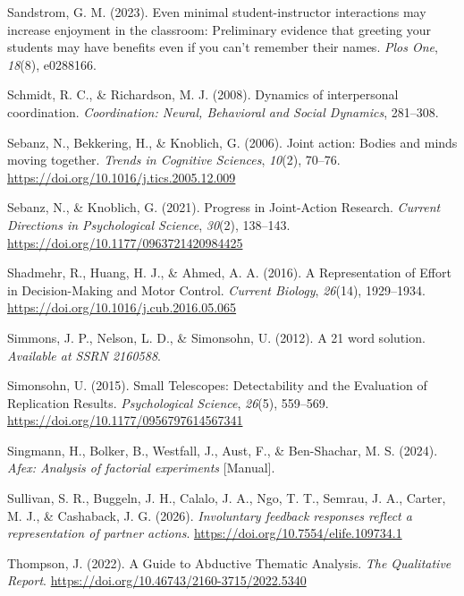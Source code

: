 \documentclass[
  11pt,
  letterpaper,
]{article}
\newlength{\cslhangindent}
\newenvironment{CSLReferences}[2] %
 {\begin{list}{}{%
  \setlength{\itemindent}{0pt}
  \setlength{\leftmargin}{0pt}
  \setlength{\parsep}{0pt}
  \ifodd #1
   \setlength{\leftmargin}{\cslhangindent}
   \setlength{\itemindent}{-1\cslhangindent}
  \fi
  \setlength{\itemsep}{#2\baselineskip}}}
 {\end{list}}
\renewcommand{\emph}[1]{\textit{#1}}  %
\begin{document}
\begin{CSLReferences}{1}{0}
Sandstrom, G. M. (2023). Even minimal student-instructor interactions
may increase enjoyment in the classroom: {Preliminary} evidence that
greeting your students may have benefits even if you can't remember
their names. \emph{Plos One}, \emph{18}(8), e0288166.

Schmidt, R. C., \& Richardson, M. J. (2008). Dynamics of interpersonal
coordination. \emph{Coordination: Neural, Behavioral and Social
Dynamics}, 281--308.

Sebanz, N., Bekkering, H., \& Knoblich, G. (2006). Joint action: Bodies
and minds moving together. \emph{Trends in Cognitive Sciences},
\emph{10}(2), 70--76. \url{https://doi.org/10.1016/j.tics.2005.12.009}

Sebanz, N., \& Knoblich, G. (2021). Progress in {Joint-Action Research}.
\emph{Current Directions in Psychological Science}, \emph{30}(2),
138--143. \url{https://doi.org/10.1177/0963721420984425}

Shadmehr, R., Huang, H. J., \& Ahmed, A. A. (2016). A {Representation}
of {Effort} in {Decision-Making} and {Motor Control}. \emph{Current
Biology}, \emph{26}(14), 1929--1934.
\url{https://doi.org/10.1016/j.cub.2016.05.065}

Simmons, J. P., Nelson, L. D., \& Simonsohn, U. (2012). A 21 word
solution. \emph{Available at SSRN 2160588}.

Simonsohn, U. (2015). Small {Telescopes}: {Detectability} and the
{Evaluation} of {Replication Results}. \emph{Psychological Science},
\emph{26}(5), 559--569. \url{https://doi.org/10.1177/0956797614567341}

Singmann, H., Bolker, B., Westfall, J., Aust, F., \& Ben-Shachar, M. S.
(2024). \emph{Afex: {Analysis} of factorial experiments} {[}Manual{]}.

Sullivan, S. R., Buggeln, J. H., Calalo, J. A., Ngo, T. T., Semrau, J.
A., Carter, M. J., \& Cashaback, J. G. (2026). \emph{Involuntary
feedback responses reflect a representation of partner actions}.
\url{https://doi.org/10.7554/elife.109734.1}

Thompson, J. (2022). A {Guide} to {Abductive Thematic Analysis}.
\emph{The Qualitative Report}.
\url{https://doi.org/10.46743/2160-3715/2022.5340}


\end{CSLReferences}
\end{document}
